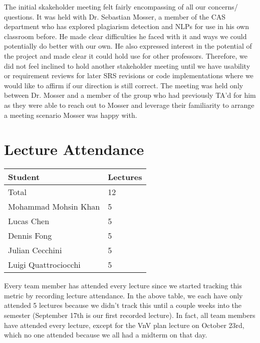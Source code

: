 \documentclass{article}
\begin{document}
The initial skakeholder meeting felt fairly encompassing of all our concerns/
questions. It was held with Dr. Sebastian Mosser, a member of the CAS department 
who has explored plagiarism detection and NLPs for use in his own classroom before. 
He made clear difficulties he faced with it and ways we could potentially do better 
with our own. He also expressed interest in the potential of the project and made clear
it could hold use for other professors. Therefore, we did not feel inclined to hold 
another stakeholder meeting until we have usability or requirement reviews for later 
SRS revisions or code implementations where we would like to affirm if our direction 
is still correct. The meeting was held only between Dr. Mosser and a member of the 
group who had previously TA'd for him as they were able to reach out to Mosser and 
leverage their familiarity to arrange a meeting scenario Mosser was happy with.

\section{Lecture Attendance}

\begin{table}[H]
\centering
\begin{tabular}{ll}
\toprule
\textbf{Student} & \textbf{Lectures}\\
\midrule
Total & 12\\
Mohammad Mohsin Khan & 5\\
Lucas Chen & 5\\
Dennis Fong & 5\\
Julian Cecchini & 5\\
Luigi Quattrociocchi & 5\\
\bottomrule
\end{tabular}
\end{table}

Every team member has attended every lecture since we started tracking
this metric by recording lecture attendance. In the above table, we each
have only attended 5 lectures because we didn't track this until a couple
weeks into the semester (September 17th is our first recorded lecture).
In fact, all team members have attended every lecture, except for the
VnV plan lecture on October 23rd, which no one attended because we all
had a midterm on that day.
\end{document}
